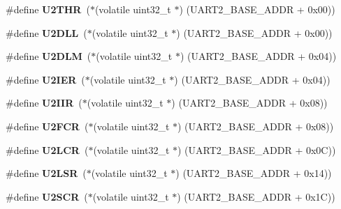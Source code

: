 \begin{DoxyCompactItemize}
\#define {\bfseries U2\+T\+HR}~($\ast$(volatile uint32\+\_\+t $\ast$) (U\+A\+R\+T2\+\_\+\+B\+A\+S\+E\+\_\+\+A\+D\+DR + 0x00))
\item 
\mbox{\label{group__lpc24xx__regs_ga4c12c688405bf62127516b45384c4793}} 
\#define {\bfseries U2\+D\+LL}~($\ast$(volatile uint32\+\_\+t $\ast$) (U\+A\+R\+T2\+\_\+\+B\+A\+S\+E\+\_\+\+A\+D\+DR + 0x00))
\item 
\mbox{\label{group__lpc24xx__regs_gaa90f827d34f6aa819098aaa5039bde0e}} 
\#define {\bfseries U2\+D\+LM}~($\ast$(volatile uint32\+\_\+t $\ast$) (U\+A\+R\+T2\+\_\+\+B\+A\+S\+E\+\_\+\+A\+D\+DR + 0x04))
\item 
\mbox{\label{group__lpc24xx__regs_gac258c7989c6983815701f5dd47399956}} 
\#define {\bfseries U2\+I\+ER}~($\ast$(volatile uint32\+\_\+t $\ast$) (U\+A\+R\+T2\+\_\+\+B\+A\+S\+E\+\_\+\+A\+D\+DR + 0x04))
\item 
\mbox{\label{group__lpc24xx__regs_ga039e475d893e2e7181236cb4ad8c5e40}} 
\#define {\bfseries U2\+I\+IR}~($\ast$(volatile uint32\+\_\+t $\ast$) (U\+A\+R\+T2\+\_\+\+B\+A\+S\+E\+\_\+\+A\+D\+DR + 0x08))
\item 
\mbox{\label{group__lpc24xx__regs_gaf1bcda29d2ae3000ba65e186ea156236}} 
\#define {\bfseries U2\+F\+CR}~($\ast$(volatile uint32\+\_\+t $\ast$) (U\+A\+R\+T2\+\_\+\+B\+A\+S\+E\+\_\+\+A\+D\+DR + 0x08))
\item 
\mbox{\label{group__lpc24xx__regs_gaac0f1ec20a9f12ae03e59b091e50e794}} 
\#define {\bfseries U2\+L\+CR}~($\ast$(volatile uint32\+\_\+t $\ast$) (U\+A\+R\+T2\+\_\+\+B\+A\+S\+E\+\_\+\+A\+D\+DR + 0x0\+C))
\item 
\mbox{\label{group__lpc24xx__regs_gaf3a0674d97031835dabc003c2980c6f2}} 
\#define {\bfseries U2\+L\+SR}~($\ast$(volatile uint32\+\_\+t $\ast$) (U\+A\+R\+T2\+\_\+\+B\+A\+S\+E\+\_\+\+A\+D\+DR + 0x14))
\item 
\mbox{\label{group__lpc24xx__regs_gaa97a7ff9576352323249b78eda727c91}} 
\#define {\bfseries U2\+S\+CR}~($\ast$(volatile uint32\+\_\+t $\ast$) (U\+A\+R\+T2\+\_\+\+B\+A\+S\+E\+\_\+\+A\+D\+DR + 0x1\+C))

\end{DoxyCompactItemize}
